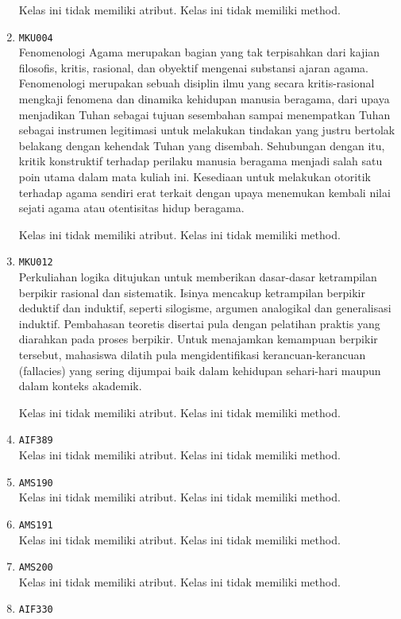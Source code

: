 \documentclass{article}
\begin{document}
\begin{enumerate}
Kelas ini tidak memiliki atribut. Kelas ini tidak memiliki method. \item \texttt{MKU004}\\ 
Fenomenologi Agama merupakan bagian yang tak terpisahkan dari kajian filosofis, kritis, 
 rasional, dan obyektif mengenai substansi ajaran agama. Fenomenologi merupakan sebuah 
 disiplin ilmu yang secara kritis-rasional mengkaji fenomena dan dinamika kehidupan manusia 
 beragama, dari upaya menjadikan Tuhan sebagai tujuan sesembahan sampai menempatkan Tuhan 
 sebagai instrumen legitimasi untuk melakukan tindakan yang justru bertolak belakang dengan 
 kehendak Tuhan yang disembah. Sehubungan dengan itu, kritik konstruktif terhadap perilaku 
 manusia beragama menjadi salah satu poin utama dalam mata kuliah ini. Kesediaan untuk 
 melakukan otoritik terhadap agama sendiri erat terkait dengan upaya menemukan kembali nilai
 sejati agama atau otentisitas hidup beragama.

Kelas ini tidak memiliki atribut. Kelas ini tidak memiliki method. \item \texttt{MKU012}\\ 
Perkuliahan logika ditujukan untuk memberikan dasar-dasar ketrampilan berpikir rasional dan
 sistematik. Isinya mencakup ketrampilan berpikir deduktif dan induktif, seperti silogisme, 
 argumen analogikal dan generalisasi induktif. Pembahasan teoretis disertai pula dengan
 pelatihan praktis yang diarahkan pada proses berpikir. Untuk menajamkan kemampuan berpikir 
 tersebut, mahasiswa dilatih pula mengidentifikasi kerancuan-kerancuan (fallacies) yang sering 
 dijumpai baik dalam kehidupan sehari-hari maupun dalam konteks akademik.

Kelas ini tidak memiliki atribut. Kelas ini tidak memiliki method. \item \texttt{AIF389}\\ 


Kelas ini tidak memiliki atribut. Kelas ini tidak memiliki method. \item \texttt{AMS190}\\ 


Kelas ini tidak memiliki atribut. Kelas ini tidak memiliki method. \item \texttt{AMS191}\\ 


Kelas ini tidak memiliki atribut. Kelas ini tidak memiliki method. \item \texttt{AMS200}\\ 


Kelas ini tidak memiliki atribut. Kelas ini tidak memiliki method. \item \texttt{AIF330}\\ 



\end{enumerate}
\end{document}
